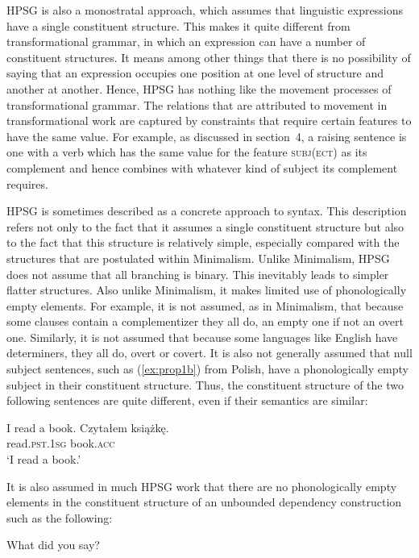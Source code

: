 \documentclass[output=paper
	        ,collection
	        ,collectionchapter
 	        ,biblatex
                ,babelshorthands
                ,newtxmath
                ,draftmode
                ,colorlinks, citecolor=brown
]{langscibook}
\begin{document}
HPSG is also a monostratal approach, which assumes that linguistic expressions have a single constituent structure. This makes it quite different from transformational grammar, in which an expression can have a number of constituent structures. It means among other things that there is no possibility of saying that an expression occupies one position at one level of structure and another at another. Hence, HPSG has nothing like the movement processes of transformational grammar. The relations that are attributed to movement in transformational work are captured by constraints that require certain features to have the same value. For example, as discussed in section~4, a raising sentence is one with a verb which has the same value for the feature \textsc{subj(ect)} as its complement and hence combines with whatever kind of subject its complement requires.

HPSG is sometimes described as a concrete approach to syntax. This description refers not only to the fact that it assumes a single constituent structure but also to the fact that this structure is relatively simple, especially compared with the structures that are postulated within Minimalism. Unlike Minimalism, HPSG does not assume that all branching is binary. This inevitably leads to simpler flatter structures. Also unlike Minimalism, it makes limited use of phonologically empty elements. For example, it is not assumed, as in Minimalism, that because some clauses contain a complementizer they all do, an empty one if not an overt one. Similarly, it is not assumed that because some languages like English have determiners, they all do, overt or covert. It is also not generally assumed that null subject sentences, such as (\ref{ex:prop1b}) from Polish, have a phonologically empty subject in their constituent structure. Thus, the constituent structure of the two following sentences are quite different, even if their semantics are similar:

\ea\label{ex:prop1}
	\ea\label{ex:prop1a}
	I read a book.
	\ex\label{ex:prop1b}
	\gll Czytałem książkę.\\
	read\textsc{.pst.1sg} book\textsc{.acc}\\
	\glt ‘I read a book.’
	\z
\z

It is also assumed in much HPSG work that there are no phonologically empty elements in the constituent structure of an unbounded dependency construction such as the following:

\ea\label{ex:prop2}
What did you say?
\z
\end{document}
